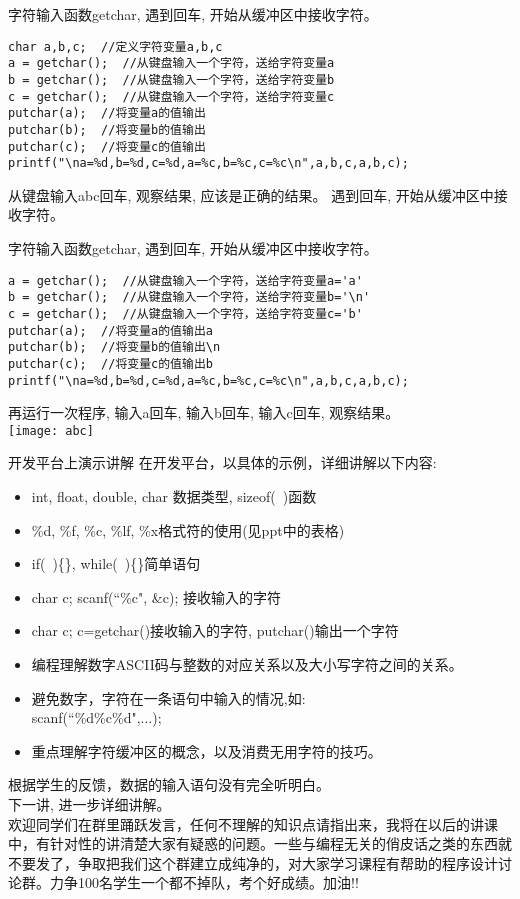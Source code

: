 \begin{frame}[fragile]{字符输入函数getchar, 遇到回车, 开始从缓冲区中接收字符。}
\begin{lstlisting}
char a,b,c;  //定义字符变量a,b,c
a = getchar();  //从键盘输入一个字符，送给字符变量a
b = getchar();  //从键盘输入一个字符，送给字符变量b
c = getchar();  //从键盘输入一个字符，送给字符变量c
putchar(a);  //将变量a的值输出
putchar(b);  //将变量b的值输出 
putchar(c);  //将变量c的值输出
printf("\na=%d,b=%d,c=%d,a=%c,b=%c,c=%c\n",a,b,c,a,b,c);
\end{lstlisting}
从键盘输入abc回车, 观察结果, 应该是正确的结果。
遇到回车, 开始从缓冲区中接收字符。
\end{frame}

\begin{frame}[fragile]{字符输入函数getchar, 遇到回车, 开始从缓冲区中接收字符。}
\begin{lstlisting}
a = getchar();  //从键盘输入一个字符，送给字符变量a='a'
b = getchar();  //从键盘输入一个字符，送给字符变量b='\n'
c = getchar();  //从键盘输入一个字符，送给字符变量c='b'
putchar(a);  //将变量a的值输出a
putchar(b);  //将变量b的值输出\n 
putchar(c);  //将变量c的值输出b
printf("\na=%d,b=%d,c=%d,a=%c,b=%c,c=%c\n",a,b,c,a,b,c);
\end{lstlisting}
再运行一次程序, 输入a回车, 输入b回车, 输入c回车, 观察结果。\\
\texttt{[image: abc]}
\end{frame}

\begin{frame}{开发平台上演示讲解}
在开发平台，以具体的示例，详细讲解以下内容:
\begin{itemize}
	\item int, float, double, char 数据类型, sizeof(~)函数
	\item \%d, \%f, \%c, \%lf, \%x格式符的使用(见ppt中的表格)
	\item if(~)\{\quad\}, while(~)\{\quad\}简单语句
	\item char c; scanf(``\%c", \&c); 接收输入的字符
	\item char c; c=getchar()接收输入的字符, putchar()输出一个字符
	\item 编程理解数字ASCII码与整数的对应关系以及大小写字符之间的关系。
	\item 避免数字，字符在一条语句中输入的情况,如:\\ scanf(``\%d\%c\%d",...);
	\item 重点理解字符缓冲区的概念，以及消费无用字符的技巧。
\end{itemize}
\end{frame}

\note
{
根据学生的反馈，数据的输入语句没有完全听明白。 \\
下一讲, 进一步详细讲解。\\
欢迎同学们在群里踊跃发言，任何不理解的知识点请指出来，我将在以后的讲课中，有针对性的讲清楚大家有疑惑的问题。一些与编程无关的俏皮话之类的东西就不要发了，争取把我们这个群建立成纯净的，对大家学习课程有帮助的程序设计讨论群。力争100名学生一个都不掉队，考个好成绩。加油!!
}




